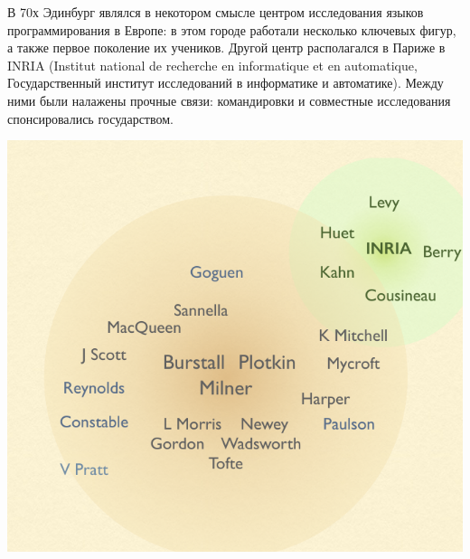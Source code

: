 \documentclass[14pt]{matmex-diploma-custom}
\begin{document}
В 70х Эдинбург являлся в некотором смысле центром исследования языков программирования в Европе: в этом городе работали несколько ключевых фигур, а также первое поколение их учеников. Другой центр располагался в Париже в INRIA (Institut national de recherche en informatique et en automatique, Государственный институт исследований в информатике и автоматике). Между ними были налажены прочные связи: командировки и совместные исследования спонсировались государством.

\includegraphics[angle=0,scale=0.7]{two_circles.png}
\end{document}
